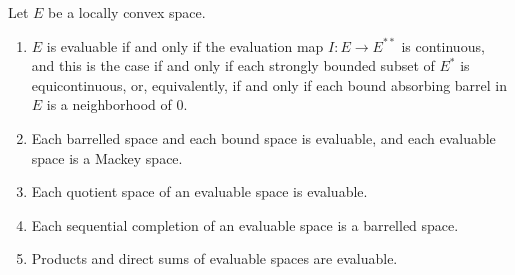 Let $E$ be a locally convex space.
\begin{enumerate}
\item[(i)] $E$ is evaluable if and only if the evaluation map $I \colon E \to E^{**}$ is continuous, and this is the case if and only if each strongly bounded subset of $E^*$ is equicontinuous, or, equivalently, if and only if each bound absorbing barrel in $E$ is a neighborhood of $0$.
\item[(ii)] Each barrelled space and each bound space is evaluable, and each evaluable space is a Mackey space.
\item[(iii)] Each quotient space of an evaluable space is evaluable.
\item[(iv)] Each sequential completion of an evaluable space is a barrelled space.
\item[(v)] Products and direct sums of evaluable spaces are evaluable.
\end{enumerate}
